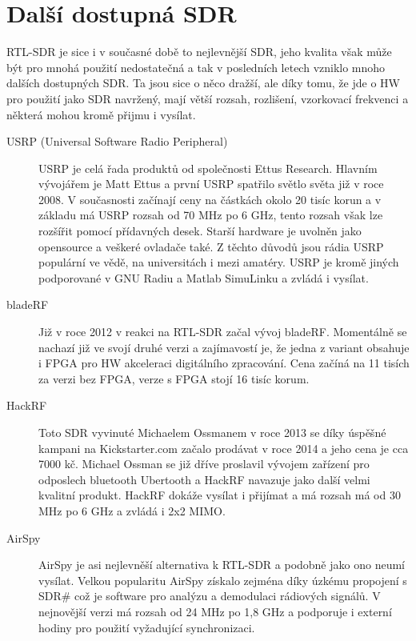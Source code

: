 \documentclass{ctuthesis}
\begin{document}
\section{Další dostupná SDR}
RTL-SDR je sice i v současné době to nejlevnější SDR, jeho kvalita však může být pro mnohá použití nedostatečná a tak v posledních letech vzniklo mnoho dalších dostupných SDR. Ta jsou sice o něco dražší, ale díky tomu, že jde o HW pro použití jako SDR navržený, mají větší rozsah, rozlišení, vzorkovací frekvenci a některá mohou kromě přijmu i vysílat.
\begin{description}
\item[USRP (Universal Software Radio Peripheral)]
USRP je celá řada produktů od společnosti Ettus Research. Hlavním vývojářem je Matt Ettus a první USRP spatřilo světlo světa již v roce 2008. V současnosti začínají ceny na částkách okolo 20 tisíc korun a v základu má USRP rozsah od 70 MHz po 6 GHz, tento rozsah však lze rozšířit pomocí přídavných desek. Starší hardware je uvolněn jako opensource a veškeré ovladače také. Z těchto důvodů jsou rádia USRP populární ve vědě, na universitách i mezi amatéry. USRP je kromě jiných podporované v GNU Radiu a Matlab SimuLinku a zvládá i vysílat. \cite{etusresearch}
\item[bladeRF]
Již v roce 2012 v reakci na RTL-SDR začal vývoj bladeRF. Momentálně se nachazí již ve svojí druhé verzi a zajímavostí je, že jedna z variant obsahuje i FPGA pro HW akceleraci digitálního zpracování. Cena začíná na 11 tisích za verzi bez FPGA, verze s FPGA stojí 16 tisíc korum. \cite{nuand}
\item[HackRF]
Toto SDR vyvinuté Michaelem Ossmanem v roce 2013 se díky úspěšné kampani na Kickstarter.com  začalo prodávat v roce 2014 a jeho cena je cca 7000 kč. Michael Ossman se již dříve proslavil vývojem zařízení pro odposlech bluetooth Ubertooth a HackRF navazuje jako další velmi kvalitní produkt. HackRF dokáže vysílat i přijímat a má rozsah má od 30 MHz po 6 GHz a zvládá i 2x2 MIMO. \cite{hackrf}
\item[AirSpy]
AirSpy je asi nejlevněší alternativa k RTL-SDR a podobně jako ono neumí vysílat. Velkou popularitu AirSpy získalo zejména díky úzkému propojení s SDR\#  což je software pro analýzu a demodulaci rádiových signálů. V nejnovější verzi má rozsah od 24 MHz po 1,8 GHz a podporuje i externí hodiny pro použití vyžadující synchronizaci.
\cite{airspy}
\end{description}
\end{document}
